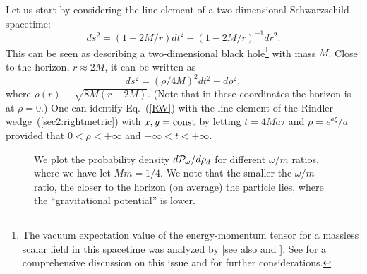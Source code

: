 \documentclass[12pt,nofootinbib,floatfix,aps,prd,showpacs,amsmath,amssymb,eqsecnum]{revtex4-2}
\begin{document}
Let us start by considering the line element of a two-dimensional 
Schwarzschild spacetime:
\begin{equation}
ds^2= \left( 1 - 2M/r \right) dt^2 - \left( 1 - 2M/r \right)^{-1} dr^2.
\label{SS}
\end{equation}
This can be seen as describing a two-dimensional 
black hole\footnote{The vacuum expectation value of the energy-momentum 
                    tensor for a massless scalar field in this spacetime 
                    was analyzed by \textcite{Daviesetal76} [see also
                    \textcite{Davies76} and \textcite{Daviesetal77b}]. 
                    See 
                    \textcite{Christensenetal77} for a comprehensive discussion
                    on this issue and \textcite{Candelasetal79} for further 
                    considerations.} 
with mass $M$. Close to the horizon, $r \approx 2M$, it can be written as
\begin{equation}
ds^2=  (\rho/4M)^2 dt^2 -  d\rho^2,
\label{RW}
\end{equation}
where $\rho(r) \equiv \sqrt{8M(r-2M)}$.  (Note that in these coordinates the
horizon is at $\rho=0$.) One can identify Eq.~(\ref{RW}) with the line 
element of the Rindler wedge~(\ref{sec2:rightmetric}) with $x,y = {\rm const}$ 
by letting $t=4Ma \tau$ and $\rho=e^{a \xi}/a$ provided that 
$0<\rho<+\infty$ and $-\infty < t < +\infty$. 
\begin{figure}
\begin{center}
\mbox{}
\end{center}
\caption{We plot the probability density $d{\cal P}_\omega/d\rho_d$ 
for different $\omega/m$ ratios, where we have let $Mm=1/4$. We 
note that the smaller the $\omega/m$ ratio,  the closer to the
horizon (on average) the particle lies, where the 
``gravitational potential'' is lower.}
\label{fig2ccmv}
\end{figure}
\end{document}
